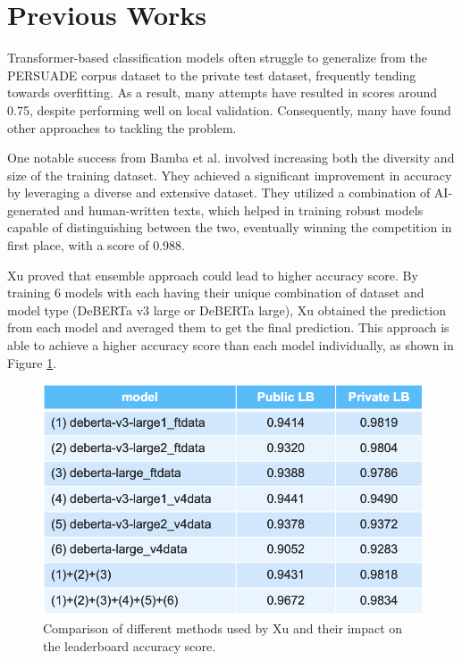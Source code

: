 \documentclass[conference]{IEEEtran}
\begin{document}
\section{Previous Works}

Transformer-based classification models often struggle to generalize from the PERSUADE corpus dataset to the private test dataset, frequently tending towards overfitting. As a result, many attempts have resulted in scores around 0.75, despite performing well on local validation. Consequently, many have found other approaches to tackling the problem.

One notable success from Bamba et al. \cite{1stplace} involved increasing both the diversity and size of the training dataset. Yhey achieved a significant improvement in accuracy by leveraging a diverse and extensive dataset. They utilized a combination of AI-generated and human-written texts, which helped in training robust models capable of distinguishing between the two, eventually winning the competition in first place, with a score of 0.988.

Xu \cite{2ndplace} proved that ensemble approach could lead to higher accuracy score. By training 6 models with each having their unique combination of dataset and model type (DeBERTa v3 large or DeBERTa large), Xu obtained the prediction from each model and averaged them to get the final prediction. This approach is able to achieve a higher accuracy score than each model individually, as shown in Figure \ref{fig:xu_table}.

\begin{figure}[htbp]
  \centerline{\includegraphics[width=\columnwidth]{figs/xu_table.png}}
  \caption{Comparison of different methods used by Xu \cite{2ndplace} and their impact on the leaderboard accuracy score.}
  \label{fig:xu_table}
\end{figure}
\end{document}

